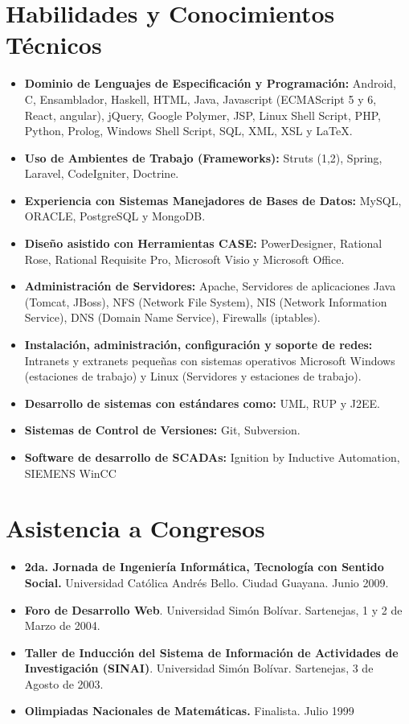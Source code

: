 \documentclass[letterpaper,11pt]{report}
\begin{document}
\section*{Habilidades y Conocimientos Técnicos}
\begin{itemize}
\item \textbf{Dominio de Lenguajes de Especificación y Programación:} Android, C, Ensamblador, Haskell, HTML, Java, Javascript (ECMAScript 5 y 6, React, angular), jQuery, Google Polymer, JSP, Linux Shell Script, PHP, Python, Prolog, Windows Shell Script, SQL, XML, XSL y LaTeX.
\item \textbf{Uso de Ambientes de Trabajo (Frameworks):} Struts (1,2), Spring, Laravel, CodeIgniter, Doctrine.
\item \textbf{Experiencia con Sistemas Manejadores de Bases de Datos:} MySQL, ORACLE, PostgreSQL y MongoDB.
\item \textbf{Dise\~{n}o asistido con Herramientas CASE:} PowerDesigner, Rational Rose, Rational Requisite Pro, Microsoft Visio y Microsoft Office.
\item \textbf{Administración de Servidores:} Apache, Servidores de aplicaciones Java (Tomcat, JBoss), NFS (Network File System), NIS (Network Information Service), DNS (Domain Name Service), Firewalls (iptables).
\item \textbf{Instalación, administración, configuración y soporte de redes:} Intranets y extranets peque\~{n}as con sistemas operativos Microsoft Windows (estaciones de trabajo) y Linux (Servidores y estaciones de trabajo).
\item \textbf{Desarrollo de sistemas con estándares como:} UML, RUP y J2EE.
\item \textbf{Sistemas de Control de Versiones:} Git, Subversion.
\item \textbf{Software de desarrollo de SCADAs:} Ignition by Inductive Automation, SIEMENS WinCC
\end{itemize}

\section*{Asistencia a Congresos}
\begin{itemize}
\item
\textbf{2da. Jornada de Ingeniería Informática, Tecnología con Sentido Social.} Universidad Católica Andrés Bello. Ciudad Guayana. Junio 2009.
\item
\textbf{Foro de Desarrollo Web}. Universidad Simón Bolívar. Sartenejas, 1 y 2 de Marzo de 2004.
\item
\textbf{Taller de Inducción del Sistema de Información de Actividades de Investigación (SINAI)}. Universidad Simón Bolívar. Sartenejas, 3 de Agosto de 2003.
\item
\textbf{Olimpiadas Nacionales de Matemáticas.} Finalista. Julio 1999
\end{itemize}
\end{document}
